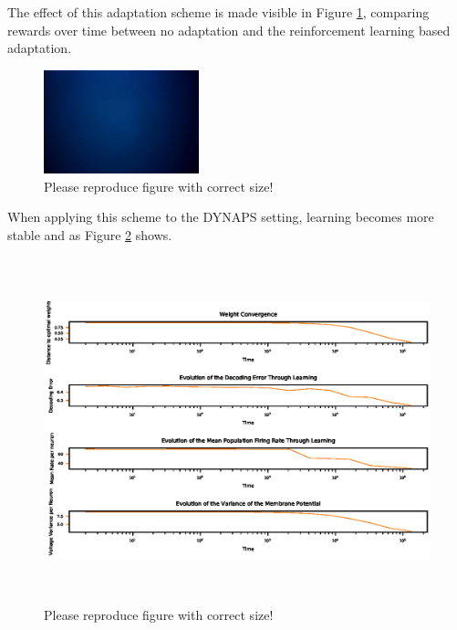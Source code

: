 \documentclass[twoside,11pt]{article}
\begin{document}
The effect of this adaptation scheme is made visible in Figure \ref{fig:rewards}, comparing
rewards over time between no adaptation and the reinforcement learning based adaptation.

\begin{figure}[!htb]
  \centering
  \includegraphics[width = \columnwidth, height=3cm]{figures/placeholder.jpeg}
  \caption{Please reproduce figure with correct size!}
  \label{fig:rewards}
\end{figure}

When applying this scheme to the DYNAPS setting, learning becomes more stable and as Figure \ref{fig:stable}
shows.

\begin{figure}[!htb]
  \centering
  \includegraphics[width = \columnwidth, height=10cm]{figures/DYNAPS_convergence_stable.eps}
  \caption{Please reproduce figure with correct size!}
  \label{fig:stable}
\end{figure}
\end{document}
